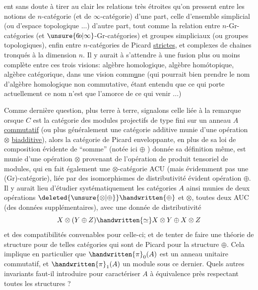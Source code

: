 
ent sans doute à tirer au clair les relations très étroites qu'on pressent
entre les notions de $n$-catégorie (et de $\infty$-catégorie) d'une part,
celle d'ensemble simplicial (ou d'espace topologique ...) d'autre part,
tout comme la relation entre $n$-Gr-catégories (et $\unsure{6\!o|\infty}$-Gr-catégories) et
groupes simpliciaux (ou groupes topologiques), enfin entre 
 $n$-catégories de Picard \uline{strictes}, et  complexes de chaines tronqués à
la dimension $n$. Il y aurait à s'attendre à une fusion plus ou moins
complète entre ces trois visions: algèbre homologique, algèbre homótopique,
algèbre catégorique, dans une vision comm\uline{u}ne (qui pourrait bien
prendre le nom d'algèbre homologique non commutative, étant entendu que
ce qui porte actuellement ce nom n'est que l'amorce de ce qui  
venir ...)

Comme dernière question, plus terre à terre, signalons celle liée
à la remarque   orsque  $C$ est la catégorie des modules projectifs de type fini sur un anneau $A$ \uline{commutatif} (ou plus généralement
une catégorie additive munie d'une opération $\otimes$   \uline{biadditive}), alors
la catégorie de Picard enveloppante, en plus de sa loi de composition
évidente de ``somme'' (notée ici $\oplus$ ) donnée   sa définition même,
est munie d'une opération $\otimes$ provenant de l'opération de produit tensoriel  de modules, qui en fait également une $\otimes$-catégorie ACU (mais évidemment pas une (Gr)-catégorie), liée par des isomorphismes de distributivité évident   opération $\oplus$. Il y aurait lieu d'étudier
systématiquement les catégories $A$ ainsi munies de deux opérations
$\deleted{\unsure{\otimes|\oplus}}\handwritten{\oplus}$ et $\otimes$, toutes deux AUC (des données supplémentaires), avec une donnée
de distributivité
\[
X\otimes(Y\oplus Z)\handwritten{\simeq}X\otimes Y\oplus X\otimes Z
\]
et des compatibilités convenables pour celle-ci; et de tenter de faire
une théorie de structure pour de telles catégories qui sont de 
Picard pour la structure $\oplus$. Cela implique en particulier que $\handwritten{\pi}_{0}(A)$
est un anneau unitaire commutatif, et $\handwritten{\pi}_{1}(A)$ un module sous ce dernier.
Quels autres invariants faut-il introduire pour caractériser $A$ à
équivalence près respectant toutes les structures ?

